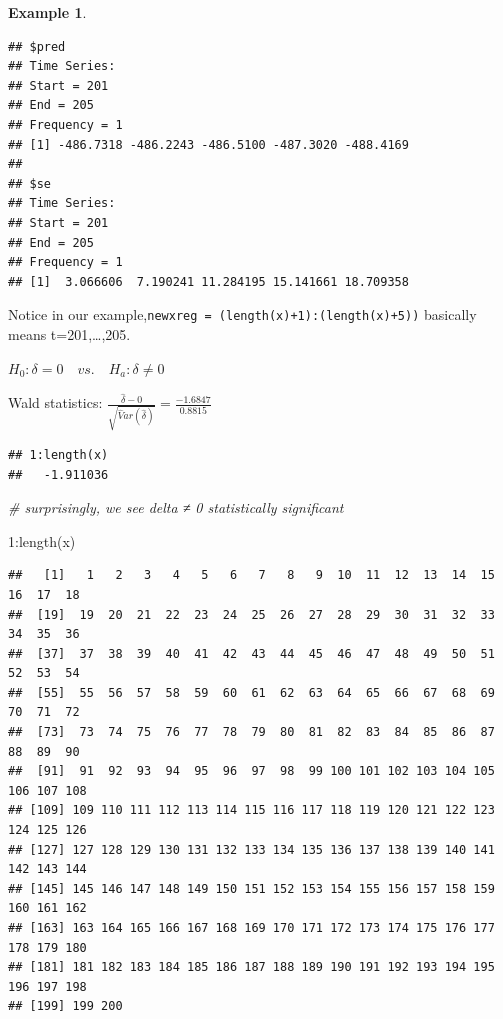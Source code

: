 \documentclass[
]{book}
\newenvironment{Shaded}{\begin{snugshade}}{\end{snugshade}}
\newcommand{\CommentTok}[1]{\textcolor[rgb]{0.56,0.35,0.01}{\textit{#1}}}
\newcommand{\DecValTok}[1]{\textcolor[rgb]{0.00,0.00,0.81}{#1}}
\newcommand{\FunctionTok}[1]{\textcolor[rgb]{0.00,0.00,0.00}{#1}}
\newcommand{\NormalTok}[1]{#1}
\newcommand{\SpecialCharTok}[1]{\textcolor[rgb]{0.00,0.00,0.00}{#1}}
\theoremstyle{definition}
\theoremstyle{definition}
\newtheorem{example}{Example}[chapter]
\theoremstyle{definition}
\theoremstyle{definition}
\theoremstyle{remark}
\begin{document}
\begin{example}
\begin{verbatim}
## $pred
## Time Series:
## Start = 201 
## End = 205 
## Frequency = 1 
## [1] -486.7318 -486.2243 -486.5100 -487.3020 -488.4169
## 
## $se
## Time Series:
## Start = 201 
## End = 205 
## Frequency = 1 
## [1]  3.066606  7.190241 11.284195 15.141661 18.709358
\end{verbatim}

Notice in our example,\texttt{newxreg\ =\ (length(x)+1):(length(x)+5))} basically means t=201,\ldots,205.

\(H_0: \delta=0\quad vs. \quad H_a: \delta \ne 0\)

Wald statistics: \(\frac{\hat \delta-0}{\sqrt{\hat Var(\hat \delta)}}=\frac{-1.6847}{0.8815}\)

\begin{Shaded}
\end{Shaded}

\begin{verbatim}
## 1:length(x) 
##   -1.911036
\end{verbatim}

\begin{Shaded}
\begin{Highlighting}[]
\CommentTok{\# surprisingly, we see delta ≠ 0 statistically significant}
\end{Highlighting}
\end{Shaded}

\begin{Shaded}
\begin{Highlighting}[]
\DecValTok{1}\SpecialCharTok{:}\FunctionTok{length}\NormalTok{(x) }
\end{Highlighting}
\end{Shaded}

\begin{verbatim}
##   [1]   1   2   3   4   5   6   7   8   9  10  11  12  13  14  15  16  17  18
##  [19]  19  20  21  22  23  24  25  26  27  28  29  30  31  32  33  34  35  36
##  [37]  37  38  39  40  41  42  43  44  45  46  47  48  49  50  51  52  53  54
##  [55]  55  56  57  58  59  60  61  62  63  64  65  66  67  68  69  70  71  72
##  [73]  73  74  75  76  77  78  79  80  81  82  83  84  85  86  87  88  89  90
##  [91]  91  92  93  94  95  96  97  98  99 100 101 102 103 104 105 106 107 108
## [109] 109 110 111 112 113 114 115 116 117 118 119 120 121 122 123 124 125 126
## [127] 127 128 129 130 131 132 133 134 135 136 137 138 139 140 141 142 143 144
## [145] 145 146 147 148 149 150 151 152 153 154 155 156 157 158 159 160 161 162
## [163] 163 164 165 166 167 168 169 170 171 172 173 174 175 176 177 178 179 180
## [181] 181 182 183 184 185 186 187 188 189 190 191 192 193 194 195 196 197 198
## [199] 199 200
\end{verbatim}


\end{example}
\end{document}

